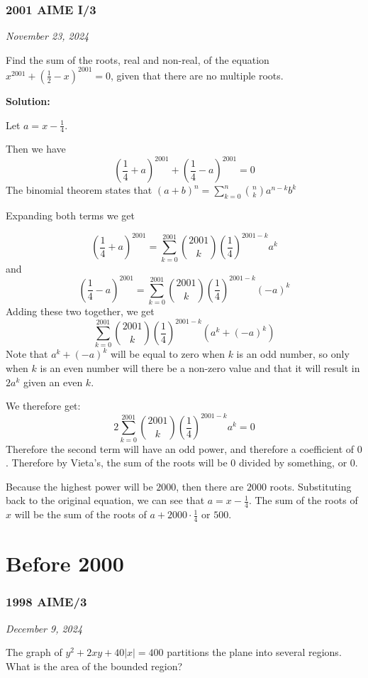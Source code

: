 \documentclass[../mathproblems.tex]{subfiles}
\begin{document}
\subsubsection*{2001 AIME I/3} 
\textit{November 23, 2024}

Find the sum of the roots, real and non-real, of the equation $x^{2001}+\left(\frac 12-x\right)^{2001}=0$, given that there are no multiple roots.

\textbf{Solution:}

Let $a=x-\frac{1}{4}$.

Then we have
\[ \left(\frac{1}{4}+a\right)^{2001} + \left(\frac{1}{4}-a\right)^{2001} = 0\]
The binomial theorem states that $(a+b)^n = \sum_{k=0}^n \binom{n}{k} a^{n-k}b^k$

Expanding both terms we get

\[ \left(\frac{1}{4}+a\right)^{2001} = \sum_{k=0}^{2001} \binom{2001}{k}\left(\frac{1}{4}\right)^{2001-k}a^k\]and
\[ \left(\frac{1}{4}-a\right)^{2001} = \sum_{k=0}^{2001} \binom{2001}{k}\left(\frac{1}{4}\right)^{2001-k}(-a)^k\]
Adding these two together, we get
\[ \sum_{k=0}^{2001} \binom{2001}{k}\left(\frac{1}{4}\right)^{2001-k} (a^k+(-a)^k)\]
Note that $a^k+(-a)^k$ will be equal to zero when $k$ is an odd number, so only when $k$ is an even number will there be a non-zero value and that it will result in $2a^k$ given an even $k$.

We therefore get:
\[ 2\sum_{k=0}^{2001} \binom{2001}{k}\left(\frac{1}{4}\right)^{2001-k} a^k = 0\]
Therefore the second term will have an odd power, and therefore a coefficient of $0$. Therefore by Vieta's, the sum of the roots will be $0$ divided by something, or $0$.

Because the highest power will be $2000$, then there are $2000$ roots. Substituting back to the original equation, we can see that $a = x-\frac{1}{4}$. The sum of the roots of $x$ will be the sum of the roots of $a+2000\cdot\frac{1}{4}$ or $\boxed{500}$.

\noindent\hrulefill
\section{Before 2000}
\subsubsection*{1998 AIME/3}
\textit{December 9, 2024}

The graph of $y^2 + 2xy + 40|x|= 400$ partitions the plane into several regions. What is the area of the bounded region? 
\end{document}
